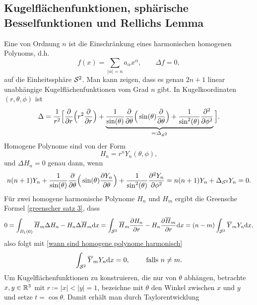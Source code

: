 
\subsection{Kugelflächenfunktionen, sphärische Besselfunktionen und Rellichs Lemma}
\renewcommand\thesection{\arabic{section}}
\renewcommand\thesubsection{\arabic{subsection}}
\setcounter{subsection}{5}
\setcounter{section}{5}
\setcounter{mydef}{0}
\setcounter{equation}{0}

Eine  von Ordnung \(n\) ist die Einschränkung eines harmonischen homogenen Polynoms, d.h.
\begin{equation*}
	f(x)=\sum_{|\alpha|=n}a_\alpha x^\alpha,\qquad\Delta f=0,
\end{equation*}
auf die Einheitssphäre \(\mathcal{S}^2\). Man kann zeigen, dass es genau \(2n+1\) linear unabhängige Kugelflächenfunktionen vom Grad \(n\) gibt. In Kugelkoordinaten \((r,\theta, \phi)\) ist
\begin{equation*}
	\Delta=\frac{1}{r^2}\Big[\frac{\partial}{\partial r}\Big(r^2\frac{\partial}{\partial r}\Big)+\underbrace{ \frac{1}{\sin(\theta)}\frac{\partial}{\partial\theta}\Big(\sin(\theta)\frac{\partial}{\partial\theta}\Big)+\frac{1}{\sin^2(\theta)}\frac{\partial^2}{\partial\phi^2} }_{\eqqcolon\Delta_{\mathcal{S}^2}}\Big].
\end{equation*}
Homogene Polynome sind von der Form
\begin{equation*}
	H_n=r^nY_n(\theta,\phi),
\end{equation*}
und \(\Delta H_n=0\) genau dann, wenn
\begin{equation}
	\label{wann sind homogene polynome harmonisch}
	n(n+1)Y_n+\frac{1}{\sin(\theta)}\frac{\partial}{\partial\theta}\Big(\sin(\theta)\frac{\partial Y_n}{\partial\theta}\Big)+\frac{1}{\sin^2(\theta)}\frac{\partial^2Y_n}{\partial\phi^2}=n(n+1)Y_n+\Delta_{\mathcal{S}^2}Y_n=0.
\end{equation}
Für zwei homogene harmonische Polynome \(H_n\) und \(H_m\) ergibt die Greensche Formel \eqref{greenscher satz 3}, dass
\begin{equation*}
	0=\int_{B_1(0)}\overline{H}_m\Delta H_n-H_n\Delta\overline{H}_m\mathrm{d}x=\int_{\mathcal{S}^2}\overline{H}_m\frac{\partial H_n}{\partial r}-H_n\frac{\partial\overline{H}_m}{\partial r}\mathrm{d}x=(n-m)\int_{\mathcal{S}^2}\overline{Y}_mY_n\mathrm{d}x,
\end{equation*}
also folgt mit \eqref{wann sind homogene polynome harmonisch}
\begin{equation}
	\int_{\mathcal{S}^2}\overline{Y}_mY_n\mathrm{d}x=0,\qquad\text{ falls }n\neq m.
\end{equation}
Um Kugelflächenfunktionen zu konstruieren, die nur von \(\theta\) abhängen, betrachte \(x,y\in\mathbb{R}^3\) mit \(r\coloneqq|x|<|y|=1\), bezeichne mit \(\theta\) den Winkel zwischen \(x\) und \(y\) und setze \(t=\cos\theta\). Damit erhält man durch Taylorentwicklung
